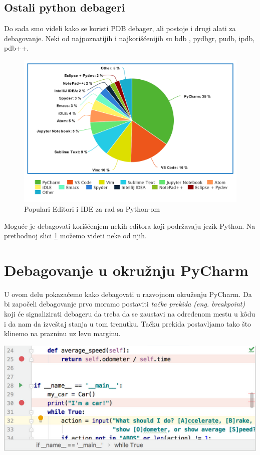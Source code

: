 \documentclass[a4paper]{article}
\begin{document}
\subsection{Ostali python debageri}
Do sada smo videli kako se koristi PDB debager, ali postoje i drugi alati za debagovanje. Neki od najpoznatijih i najkorišćenijih su bdb \cite{bdbDocPyt}, pydbgr, pudb, ipdb, pdb++.
\begin{figure}[h!]
\begin{center}
\includegraphics[scale=0.25]{pie.png}
\end{center}
\caption{Populari Editori i IDE za rad sa Python-om}
\label{fig:pie}
\end{figure}

Moguće je debagovati korišćenjem nekih editora koji podržavaju jezik Python. Na prethodnoj slici \ref{fig:pie} možemo videti neke od njih.

\section{Debagovanje u okružnju PyCharm}
U ovom delu pokazaćemo kako debagovati u razvojnom okruženju PyCharm. Da bi započeli debagovanje prvo moramo postaviti \emph{tačke prekida (eng. breakpoint)} koji će signalizirati debageru  da treba da se zaustavi na određenom mestu u k\^{o}du i da nam da izveštaj stanja u tom trenutku. Tačku prekida postavljamo tako što klinemo na prazninu uz levu marginu.

\includegraphics[scale = 0.4]{1}
\end{document}
